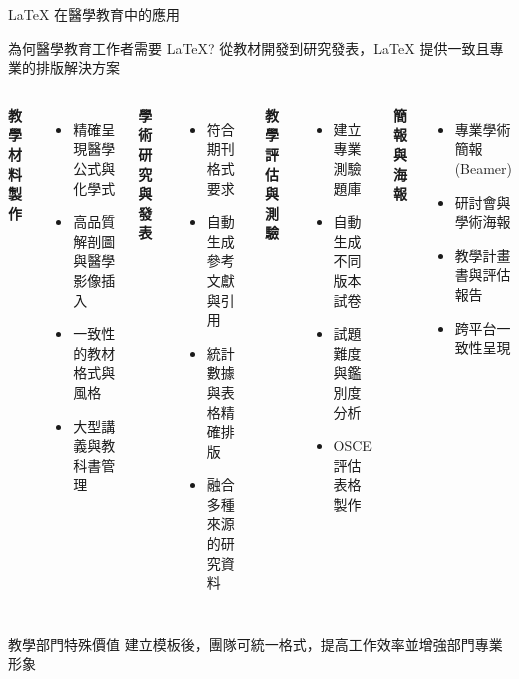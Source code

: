 \documentclass[aspectratio=169]{beamer}
\begin{document}
\begin{frame}{LaTeX 在醫學教育中的應用}
  \begin{block}{為何醫學教育工作者需要 LaTeX?}
    從教材開發到研究發表，LaTeX 提供一致且專業的排版解決方案
  \end{block}

  \begin{columns}
    \textbf{教學材料製作}
    \begin{itemize}
      \item 精確呈現醫學公式與化學式
      \item 高品質解剖圖與醫學影像插入
      \item 一致性的教材格式與風格
      \item 大型講義與教科書管理
    \end{itemize}
    
    \textbf{學術研究與發表}
    \begin{itemize}
      \item 符合期刊格式要求
      \item 自動生成參考文獻與引用
      \item 統計數據與表格精確排版
      \item 融合多種來源的研究資料
    \end{itemize}
    
    \textbf{教學評估與測驗}
    \begin{itemize}
      \item 建立專業測驗題庫
      \item 自動生成不同版本試卷
      \item 試題難度與鑑別度分析
      \item OSCE 評估表格製作
    \end{itemize}
    
    \textbf{簡報與海報}
    \begin{itemize}
      \item 專業學術簡報 (Beamer)
      \item 研討會與學術海報
      \item 教學計畫書與評估報告
      \item 跨平台一致性呈現
    \end{itemize}
  \end{columns}

\end{frame}

\begin{frame}[重要性]
  \vspace{0.3cm}
  \begin{alertblock}{教學部門特殊價值}
    建立模板後，團隊可統一格式，提高工作效率並增強部門專業形象
  \end{alertblock}
\end{frame}
\end{document}
